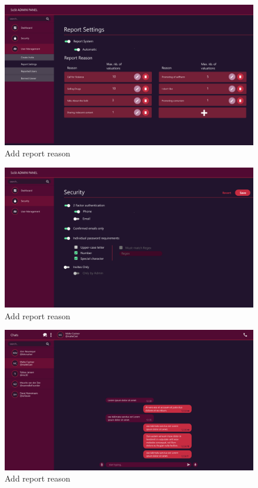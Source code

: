 \begin{figure}[h]
    \centering
    \includegraphics[width=1.0\textwidth]{./graphics/wireframes/AdminReportSettings}
    \caption{Add report reason}
    \label{fig:figure12}
\end{figure}

\begin{figure}[h]
    \centering
    \includegraphics[width=1.0\textwidth]{./graphics/wireframes/AdminSecurity}
    \caption{Add report reason}
    \label{fig:figure13}
\end{figure}

\begin{figure}[h]
    \centering
    \includegraphics[width=1.0\textwidth]{./graphics/wireframes/ChatView}
    \caption{Add report reason}
    \label{fig:figure14}
\end{figure}


